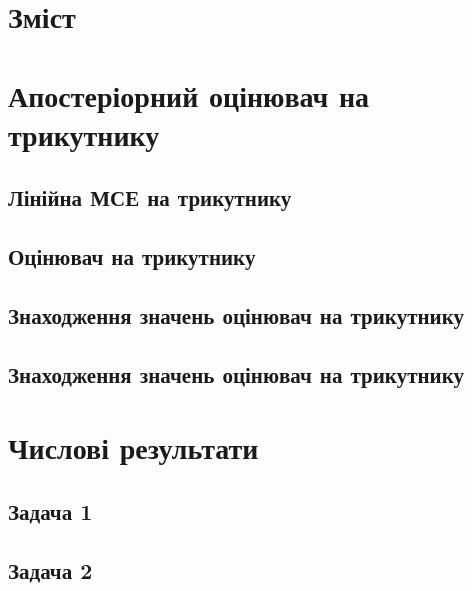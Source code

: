 \documentclass[a4paper,oneside]{article}
\begin{document}
	\pagestyle{empty} %

	

	\linespread{1.5}
	\selectfont
	\addtocounter{page}{1}

	\section*{Зміст}

	\makeatletter
	\makeatother

	\newpage
	\pagestyle{plain}

	
	
	
	
	
	\section{Апостеріорний оцінювач на трикутнику}
		\subsection{Лінійна МСЕ на трикутнику}
		\subsection{Оцінювач на трикутнику}
		\subsection{Знаходження значень оцінювач на трикутнику}
		\subsection{Знаходження значень оцінювач на трикутнику}
	\section{Числові результати}
		\subsection{Задача 1}
		\subsection{Задача 2}
\end{document}
